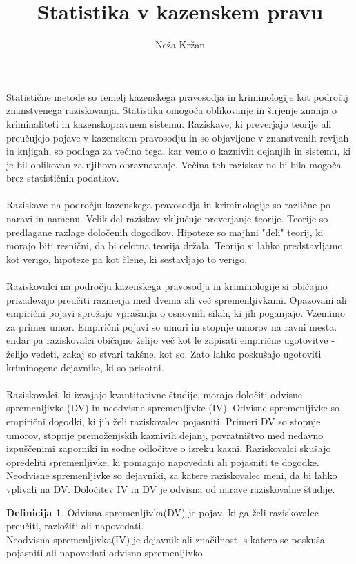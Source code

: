 \documentclass[12pt,a4paper]{amsart}
\theoremstyle{definition} %
\newtheorem{definicija}{Definicija}[section]
\theoremstyle{plain} %
\begin{document}
\title{Statistika v kazenskem pravu}
\author{Neža Kržan}
\maketitle
Statistične metode so temelj kazenskega pravosodja in kriminologije kot področij znanstvenega raziskovanja. Statistika omogoča oblikovanje in 
širjenje znanja o kriminaliteti in kazenskopravnem sistemu. Raziskave, ki preverjajo teorije ali preučujejo pojave v kazenskem pravosodju in so 
objavljene v znanstvenih revijah in knjigah, so podlaga za večino tega, kar vemo o kaznivih dejanjih in sistemu, ki je bil oblikovan za njihovo 
obravnavanje. Večina teh raziskav ne bi bila mogoča brez statističnih podatkov.\\\\
Raziskave na področju kazenskega pravosodja in kriminologije so različne po naravi in namenu. Velik del raziskav vključuje preverjanje teorije. 
Teorije so predlagane razlage določenih dogodkov. Hipoteze so majhni "deli" teorij, ki morajo biti resnični, da bi celotna teorija držala. Teorijo 
si lahko predstavljamo kot verigo, hipoteze pa kot člene, ki sestavljajo to verigo.\\\\
Raziskovalci na področju kazenskega pravosodja in kriminologije si običajno prizadevajo preučiti razmerja med dvema ali več spremenljivkami. Opazovani 
ali empirični pojavi sprožajo vprašanja o osnovnih silah, ki jih poganjajo. Vzemimo za primer umor. Empirični pojavi so umori in stopnje umorov 
na ravni mesta. endar pa raziskovalci običajno želijo več kot le zapisati empirične ugotovitve - želijo vedeti, zakaj so stvari takšne, kot so. Zato 
lahko poskušajo ugotoviti kriminogene dejavnike, ki so prisotni.\\\\
Raziskovalci, ki izvajajo kvantitativne študije, morajo določiti odvisne spremenljivke (DV) in neodvisne spremenljivke (IV). Odvisne spremenljivke 
so empirični dogodki, ki jih želi raziskovalec pojasniti. Primeri DV so stopnje umorov, stopnje premoženjskih kaznivih dejanj, povratništvo 
med nedavno izpuščenimi zaporniki in sodne odločitve o izreku kazni. Raziskovalci skušajo opredeliti spremenljivke, ki pomagajo napovedati ali 
pojasniti te dogodke. Neodvisne spremenljivke so dejavniki, za katere raziskovalec meni, da bi lahko vplivali na DV. Določitev IV in DV je 
odvisna od narave raziskovalne študije.
\begin{definicija}
    Odvisna spremenljivka(DV) je pojav, ki ga želi raziskovalec preučiti, razložiti ali napovedati.\\
    Neodvisna spremenljivka(IV) je dejavnik ali značilnost, s katero se poskuša pojasniti ali napovedati odvisno spremenljivko.
\end{definicija}
\end{document}
